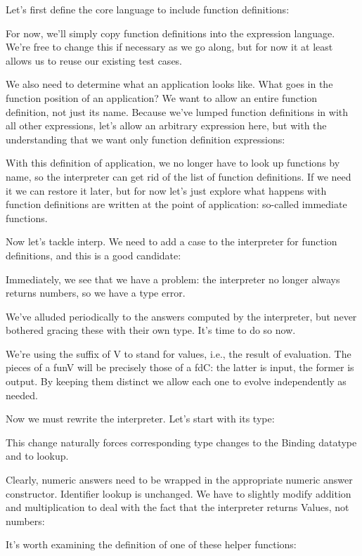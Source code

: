 
Let’s first define the core language to include function definitions:

For now, we’ll simply copy function definitions into the expression language.
We’re free to change this if necessary as we go along, but for now it at least
allows us to reuse our existing test cases.

We also need to determine what an application looks like. What goes in the
function position of an application? We want to allow an entire function
definition, not just its name. Because we’ve lumped function definitions in with
all other expressions, let’s allow an arbitrary expression here, but with the
understanding that we want only function definition expressions:

With this definition of application, we no longer have to look up functions by name,
so the interpreter can get rid of the list of function definitions. If we need it we can
restore it later, but for now let’s just explore what happens with function definitions are
written at the point of application: so-called immediate functions.

Now let’s tackle interp. We need to add a case to the interpreter for function
definitions, and this is a good candidate:

Immediately, we see that we have a problem: the interpreter no longer always
returns numbers, so we have a type error.

We’ve alluded periodically to the answers computed by the interpreter, but never
bothered gracing these with their own type. It’s time to do so now.

We’re using the suffix of V to stand for values, i.e., the result of evaluation.
The pieces of a funV will be precisely those of a fdC: the latter is input, the
former is output. By keeping them distinct we allow each one to evolve
independently as needed.

Now we must rewrite the interpreter. Let’s start with its type:

This change naturally forces corresponding type changes to the Binding datatype
and to lookup.


Clearly, numeric answers need to be wrapped in the appropriate numeric answer
constructor. Identifier lookup is unchanged. We have to slightly modify addition
and multiplication to deal with the fact that the interpreter returns Values,
not numbers:

It’s worth examining the definition of one of these helper functions:
